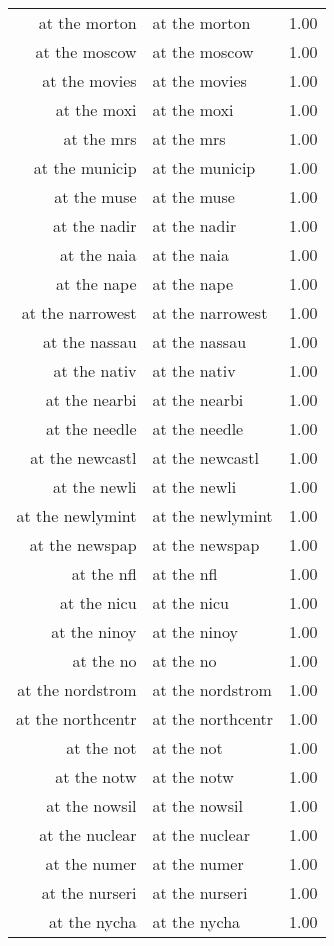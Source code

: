 \begin{table}[ht]
\begin{tabular}{rlr}
  at the morton & at the morton & 1.00 \\ 
  at the moscow & at the moscow & 1.00 \\ 
  at the movies & at the movies & 1.00 \\ 
  at the moxi & at the moxi & 1.00 \\ 
  at the mrs & at the mrs & 1.00 \\ 
  at the municip & at the municip & 1.00 \\ 
  at the muse & at the muse & 1.00 \\ 
  at the nadir & at the nadir & 1.00 \\ 
  at the naia & at the naia & 1.00 \\ 
  at the nape & at the nape & 1.00 \\ 
  at the narrowest & at the narrowest & 1.00 \\ 
  at the nassau & at the nassau & 1.00 \\ 
  at the nativ & at the nativ & 1.00 \\ 
  at the nearbi & at the nearbi & 1.00 \\ 
  at the needle & at the needle & 1.00 \\ 
  at the newcastl & at the newcastl & 1.00 \\ 
  at the newli & at the newli & 1.00 \\ 
  at the newlymint & at the newlymint & 1.00 \\ 
  at the newspap & at the newspap & 1.00 \\ 
  at the nfl & at the nfl & 1.00 \\ 
  at the nicu & at the nicu & 1.00 \\ 
  at the ninoy & at the ninoy & 1.00 \\ 
  at the no & at the no & 1.00 \\ 
  at the nordstrom & at the nordstrom & 1.00 \\ 
  at the northcentr & at the northcentr & 1.00 \\ 
  at the not & at the not & 1.00 \\ 
  at the notw & at the notw & 1.00 \\ 
  at the nowsil & at the nowsil & 1.00 \\ 
  at the nuclear & at the nuclear & 1.00 \\ 
  at the numer & at the numer & 1.00 \\ 
  at the nurseri & at the nurseri & 1.00 \\ 
  at the nycha & at the nycha & 1.00 \\ 

\end{tabular}
\end{table}
